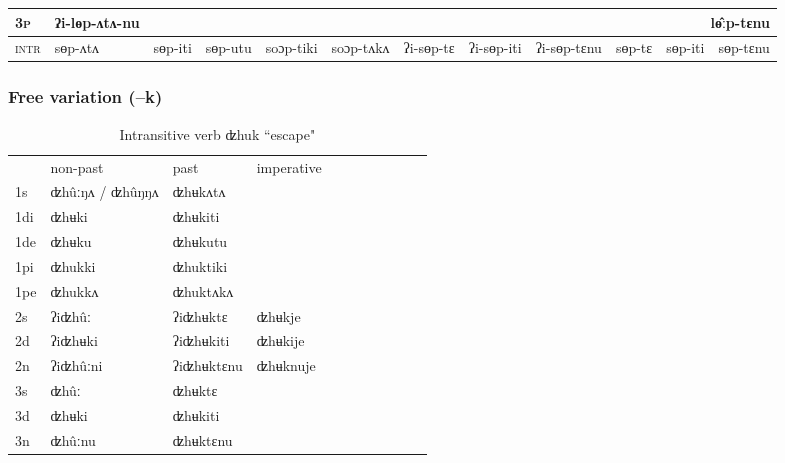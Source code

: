 \documentclass[xcolor=table]{beamer}
\newcommand{\ipa}[1]{{\phon \mbox{#1}}} %
\newcommand{\grise}[1]{\cellcolor{lightgray}\textbf{#1}}
\begin{document}
\begin{frame}
\begin{table}[H]
{\begin{tabular}{l|l|l|l|l|l|l|l|l|l|l|l|}
\cline{2-2}	
\cline{10-11}
\textsc{3p} &	 	\ipa{ʔi-lɵp-ʌtʌ-nu}  	 &	  	 &	   	&	 	  &	 	  &	 	  &		   &	   	&	   \multicolumn{3}{r|}{\ipa{lɵ̂ːp-tɛnu}   } \\	
\hline
\textsc{intr}&\ipa{sɵp-ʌtʌ}   &	\ipa{sɵp-iti}   &	\ipa{sɵp-utu}   &	\ipa{soɔp-tiki}   &	\ipa{soɔp-tʌkʌ}   &		\ipa{ʔi-sɵp-tɛ}   &		\ipa{ʔi-sɵp-iti}   &	\ipa{ʔi-sɵp-tɛnu}   &	  	   \ipa{sɵp-tɛ}   &	\ipa{sɵp-iti}   &	\ipa{sɵp-tɛnu}   	  	   \\	
\hline
\end{tabular}}
\end{table} 
  \end{frame} 
  
  \begin{frame} 
 \frametitle{Free variation (--k)} 
 
   \begin{table}[H]
\label{uk.vi}
\caption{Intransitive verb \ipa{ʣhuk} ``escape"  }
\begin{tabular}{l|l|l|l|l|l|l|l|l|l|l}  \toprule
&non-past & past & imperative \\ 
1s &ʣhûːŋʌ / ʣhûŋŋʌ \grise{} &ʣhʉkʌtʌ \\ 
1di &ʣhʉki &ʣhʉkiti   \\
1de &ʣhʉku &ʣhʉkutu   \\ 
1pi &ʣhukki &ʣhuktiki   \\ 
1pe &ʣhukkʌ &ʣhuktʌkʌ   \\ 
2s & ʔiʣhûː & ʔiʣhʉktɛ &ʣhʉkje  \\ 
2d & ʔiʣhʉki & ʔiʣhʉkiti &ʣhʉkije    \\
2n & ʔiʣhûːni  & ʔiʣhʉktɛnu &ʣhʉknuje  \\ 
3s & ʣhûː & ʣhʉktɛ   \\ 
3d & ʣhʉki & ʣhʉkiti   \\ 
3n & ʣhûːnu  & ʣhʉktɛnu \\ 
\bottomrule
\end{tabular}
\end{table}
  \end{frame}   
  
\end{document}
